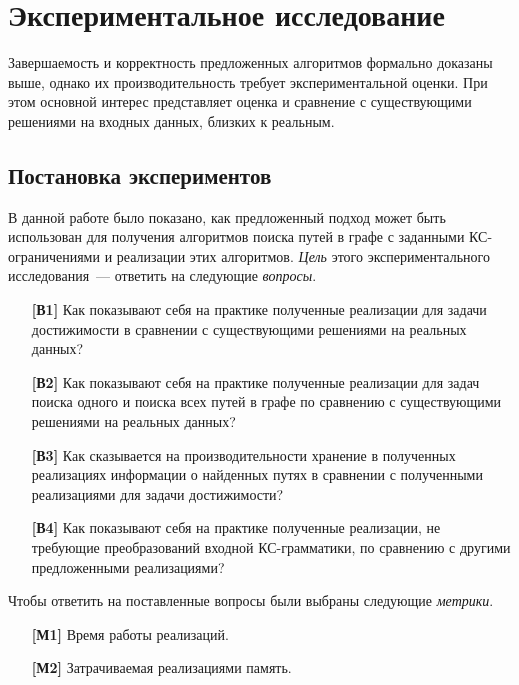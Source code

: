 \chapter{Экспериментальное исследование}\label{ch:ch5}
Завершаемость и корректность предложенных алгоритмов формально доказаны выше, однако их производительность требует экспериментальной оценки. При этом основной интерес представляет оценка и сравнение с существующими решениями на входных данных, близких к реальным.

\section{Постановка экспериментов}\label{sec:ch5/sect1}

В данной работе было показано, как предложенный подход может быть использован для получения алгоритмов поиска путей в графе с заданными КС-ограничениями и реализации этих алгоритмов. \textit{Цель} этого экспериментального исследования~--- ответить на следующие \textit{вопросы}.

\begin{enumerate}
    \item [\textbf{[В1]}] Как показывают себя на практике полученные реализации для задачи достижимости в сравнении с существующими решениями на реальных данных?
    \item [\textbf{[В2]}] Как показывают себя на практике полученные реализации для задач поиска одного и поиска всех путей в графе по сравнению с существующими решениями на реальных данных?
    \item [\textbf{[В3]}] Как сказывается на производительности хранение в полученных реализациях информации о найденных путях в сравнении с полученными реализациями для задачи достижимости?
    \item [\textbf{[В4]}] Как показывают себя на практике полученные реализации, не требующие преобразований входной КС-грамматики, по сравнению с другими предложенными реализациями?
\end{enumerate}

Чтобы ответить на поставленные вопросы были выбраны следующие \textit{метрики}.

\begin{enumerate}
    \item [\textbf{[М1]}] Время работы реализаций.
    \item [\textbf{[М2]}] Затрачиваемая реализациями память.
\end{enumerate}

